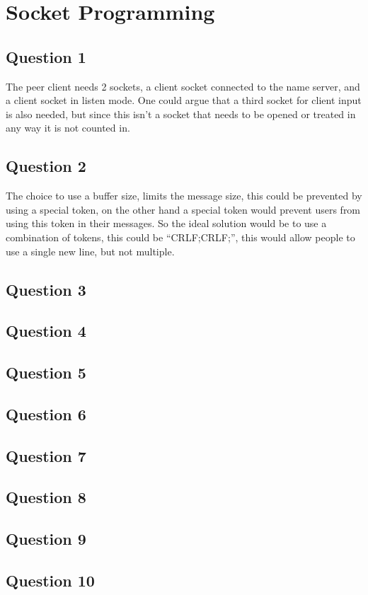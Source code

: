 \section{Socket Programming}

\subsection{Question 1}
The peer client needs 2 sockets, a client socket connected to the name server,
and a client socket in listen mode. One could argue that a third socket for
client input is also needed, but since this isn't a socket that needs to be
opened or treated in any way it is not counted in.

\subsection{Question 2}
The choice to use a buffer size, limits the message size, this could be
prevented by using a special token, on the other hand a special token would
prevent users from using this token in their messages. So the ideal solution
would be to use a combination of tokens, this could be ``CRLF;CRLF;'', this
would allow people to use a single new line, but not multiple.

\subsection{Question 3}
\subsection{Question 4}
\subsection{Question 5}
\subsection{Question 6}
\subsection{Question 7}
\subsection{Question 8}
\subsection{Question 9}
\subsection{Question 10}

